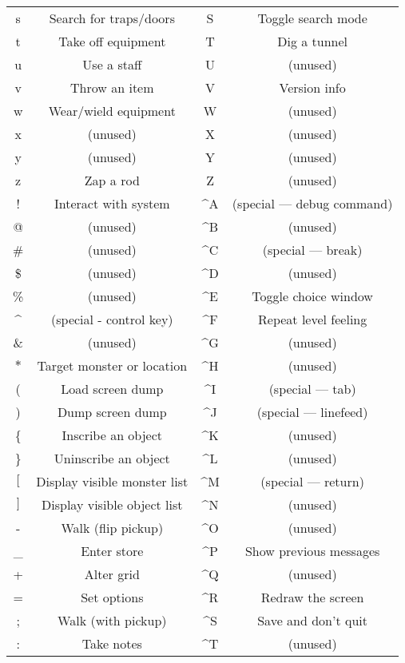 \paragraph{}
\begin{tabular}{cc|cc}
s & Search for traps/doors & S & Toggle search mode\\
t & Take off equipment & T & Dig a tunnel\\
u & Use a staff & U & (unused)\\
v & Throw an item & V & Version info\\
w & Wear/wield equipment & W & (unused)\\
x & (unused) & X & (unused)\\
y & (unused) & Y & (unused)\\
z & Zap a rod & Z & (unused)\\
! & Interact with system & \^{}A & (special --- debug command)\\
@ & (unused) & \^{}B & (unused)\\
\# & (unused) & \^{}C & (special --- break)\\
\$ & (unused) & \^{}D & (unused)\\
\% & (unused) & \^{}E & Toggle choice window\\
\^{} & (special - control key) & \^{}F & Repeat level feeling\\
\& & (unused) & \^{}G & (unused)\\
$\ast$ & Target monster or location & \^{}H & (unused)\\
( & Load screen dump & \^{}I & (special --- tab)\\
) & Dump screen dump & \^{}J & (special --- linefeed)\\
\{ & Inscribe an object & \^{}K & (unused)\\
\} & Uninscribe an object & \^{}L & (unused)\\
$[$ & Display visible monster list & \^{}M & (special --- return)\\
$]$ & Display visible object list & \^{}N & (unused)\\
- & Walk (flip pickup) & \^{}O & (unused)\\
\_ & Enter store & \^{}P & Show previous messages\\
+ & Alter grid & \^{}Q & (unused)\\
= & Set options & \^{}R & Redraw the screen\\
; & Walk (with pickup) & \^{}S & Save and don't quit\\
: & Take notes & \^{}T & (unused)\\

\end{tabular}
